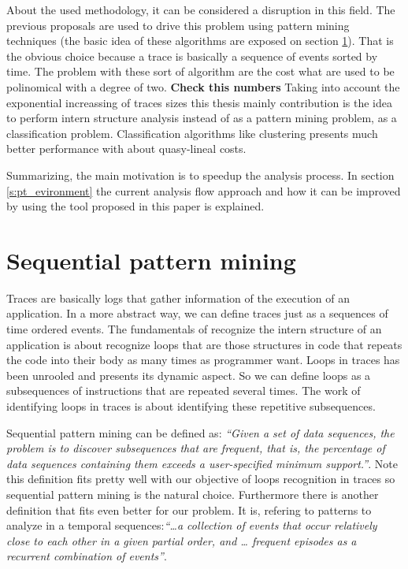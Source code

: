 About the used methodology, it can be considered a disruption in this field. The
previous proposals are used to drive this problem using pattern mining
techniques (the basic idea of these algorithms are exposed on section
\ref{pattern_mining}). That is the obvious choice because a trace is basically a
sequence of events sorted by time. The problem with these sort of algorithm are
the cost what are used to be polinomical with a degree of two. {\bf Check
this numbers} Taking into account the exponential increassing of traces sizes 
this thesis mainly contribution is the idea to perform intern 
structure analysis instead of as a pattern mining problem, as a classification
problem. Classification algorithms like clustering presents much better
performance with about quasy-lineal costs.

Summarizing, the main motivation is to speedup the analysis process. In section
\ref{s:pt_evironment} the current analysis flow approach and how it can be
improved by using the tool proposed in this paper is explained.

\section{Sequential pattern mining}\label{pattern_mining}

Traces are basically logs that gather information of the execution of an
application. In a more abstract way, we can define traces just as a sequences
of time ordered events. The fundamentals of recognize the intern structure of an
application is about recognize loops that are those structures in code that
repeats the code into their body as many times as programmer want. Loops in
traces has been unrooled and presents its dynamic aspect. So we can define loops
as a subsequences of instructions that are repeated several times. The work of
identifying loops in traces is about identifying these repetitive subsequences.

Sequential pattern mining can be defined as: \textit{``Given a set of data sequences, the
problem is to discover subsequences that are frequent, that is, the percentage of
data sequences containing them exceeds a user-specified minimum support.''}. Note 
this definition fits pretty well with our objective of loops recognition in traces 
so sequential pattern mining is the natural choice. Furthermore there is another
definition that fits even better for our problem. It is, refering to patterns to
analyze in a temporal sequences:\textit{``\ldots a collection of events that
occur relatively close to each other in a given partial order, and \ldots
frequent episodes as a recurrent combination of events''}.

